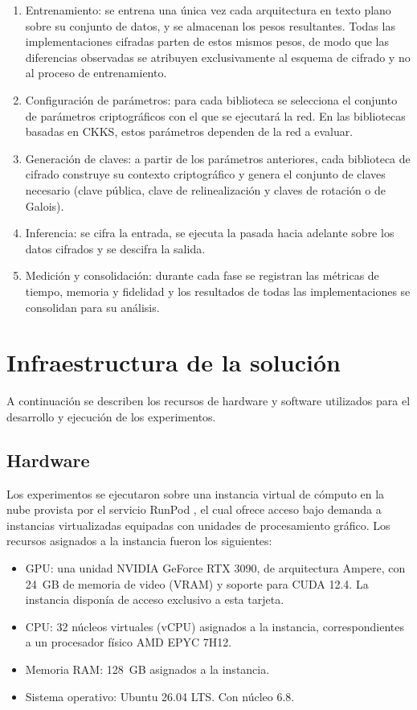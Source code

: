 \begin{enumerate}
    \item Entrenamiento: se entrena una única vez cada arquitectura en texto plano sobre su conjunto de datos, y se almacenan los pesos resultantes. Todas las implementaciones cifradas parten de estos mismos pesos, de modo que las diferencias observadas se atribuyen exclusivamente al esquema de cifrado y no al proceso de entrenamiento.
    \item Configuración de parámetros: para cada biblioteca se selecciona el conjunto de parámetros criptográficos con el que se ejecutará la red. En las bibliotecas basadas en CKKS, estos parámetros dependen de la red a evaluar.
    \item Generación de claves: a partir de los parámetros anteriores, cada biblioteca de cifrado construye su contexto criptográfico y genera el conjunto de claves necesario (clave pública, clave de relinealización y claves de rotación o de Galois).
    \item Inferencia: se cifra la entrada, se ejecuta la pasada hacia adelante sobre los datos cifrados y se descifra la salida.
    \item Medición y consolidación: durante cada fase se registran las métricas de tiempo, memoria y fidelidad y los resultados de todas las implementaciones se consolidan para su análisis.
\end{enumerate}

\section{Infraestructura de la solución}\label{sec:metodo_infraestructura}

A continuación se describen los recursos de hardware y software utilizados para el desarrollo y ejecución de los experimentos.

\subsection{Hardware}

Los experimentos se ejecutaron sobre una instancia virtual de cómputo en la nube provista por el servicio RunPod \cite{RunPod}, el cual ofrece acceso bajo demanda a instancias virtualizadas equipadas con unidades de procesamiento gráfico. Los recursos asignados a la instancia fueron los siguientes:

\begin{itemize}
    \item GPU: una unidad NVIDIA GeForce RTX 3090, de arquitectura Ampere, con 24~GB de memoria de video (VRAM) y soporte para CUDA 12.4. La instancia disponía de acceso exclusivo a esta tarjeta. 
    \item CPU: 32 núcleos virtuales (vCPU) asignados a la instancia, correspondientes a un procesador físico AMD EPYC 7H12.
    \item Memoria RAM: 128~GB asignados a la instancia.
    \item Sistema operativo: Ubuntu 26.04 LTS. Con núcleo 6.8. 
\end{itemize}

